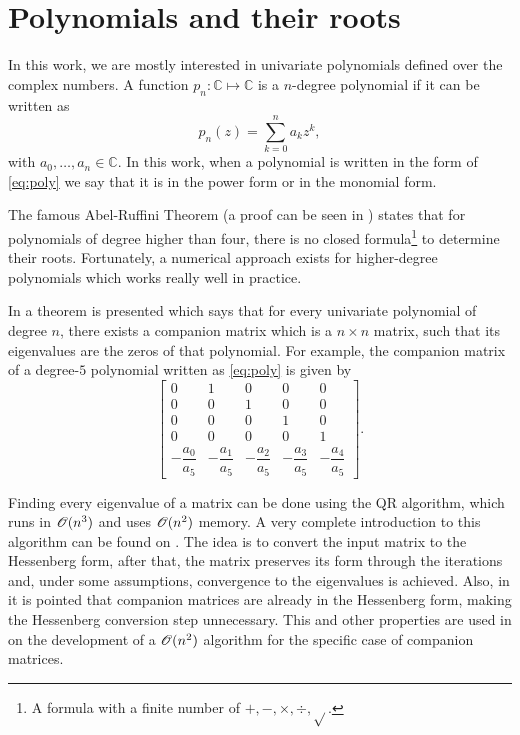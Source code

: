 \section{Polynomials and their roots}

In this work, we are mostly interested in univariate polynomials defined over the complex numbers.
A function $p_n: \mathbb{C} \mapsto \mathbb{C}$ is a $n$-degree polynomial if it can be written as
\begin{equation}\label{eq:poly}
p_n(z) = \sum_{k=0}^{n} a_k z^k,
\end{equation}
with $a_0, \dots, a_n \in \mathbb{C}$. In this work, when a polynomial is written in the form of \autoref{eq:poly} we say that it is in the power form or in the monomial form.

The famous Abel-Ruffini Theorem (a proof can be seen in ) states that for polynomials of degree higher than four, there is no closed formula\footnote{A formula with a finite number of $+, -, \times, \div, \sqrt{}$.} to determine their roots. Fortunately, a numerical approach exists for higher-degree polynomials which works really well in practice.

 In  a theorem is presented which says that for every univariate polynomial of degree $n$, there exists a companion matrix which is a $n\times n$ matrix, such that its eigenvalues are the zeros of that polynomial. For example, the companion matrix of a degree-$5$ polynomial written as \autoref{eq:poly} is given by
 \begin{equation*}
 \left[\begin{array}{ccccc}
 0 & 1 & 0 & 0 & 0\\
 0 & 0 & 1 & 0 & 0\\
 0 & 0 & 0 & 1 & 0\\
 0 & 0 & 0 & 0 & 1\\
 -\dfrac{a_0}{a_5} & -\dfrac{a_1}{a_5} & -\dfrac{a_2}{a_5} & -\dfrac{a_3}{a_5} & -\dfrac{a_4}{a_5}
 \end{array}\right].
 \end{equation*}


 Finding every eigenvalue of a matrix can be done using the QR algorithm, which runs in $\mathscr{O}(n^3)$ and uses $\mathscr{O}(n^2)$ memory. A very complete introduction to this algorithm can be found on . The idea is to convert the input matrix to the Hessenberg form, after that, the matrix preserves its form through the iterations and, under some assumptions, convergence to the eigenvalues is achieved.
 Also, in  it is pointed that companion matrices are already in the Hessenberg form, making the Hessenberg conversion step unnecessary. This and other properties are used in  on the development of a $\mathscr{O}(n^2)$ algorithm for the specific case of companion matrices.
 
